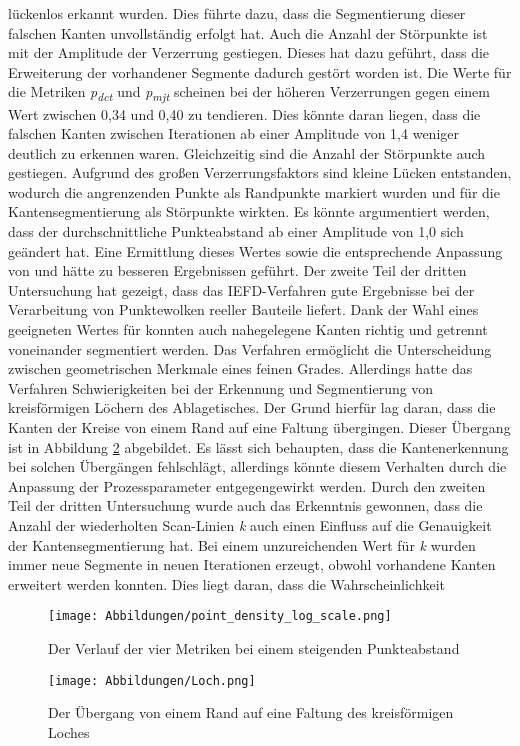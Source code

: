 lückenlos erkannt wurden. Dies führte dazu, dass die Segmentierung dieser falschen Kanten unvollständig erfolgt hat. Auch die Anzahl der Störpunkte ist mit der Amplitude der Verzerrung gestiegen. Dieses hat dazu geführt, dass die Erweiterung der vorhandener Segmente dadurch gestört worden ist. Die Werte für die Metriken  \textit{p\textsubscript{dct}} und \textit{p\textsubscript{mjt}} scheinen bei der höheren Verzerrungen gegen einem Wert zwischen 0,34 und 0,40 zu tendieren. Dies könnte daran liegen, dass die falschen Kanten zwischen Iterationen ab einer Amplitude von 1,4 weniger deutlich zu erkennen waren. Gleichzeitig sind die Anzahl der Störpunkte auch gestiegen. Aufgrund des großen Verzerrungsfaktors sind kleine Lücken entstanden, wodurch die angrenzenden Punkte als Randpunkte markiert wurden und für die Kantensegmentierung als Störpunkte wirkten. Es könnte argumentiert werden, dass der durchschnittliche Punkteabstand ab einer Amplitude von 1,0 sich geändert hat. Eine Ermittlung dieses Wertes sowie die entsprechende Anpassung von \distthresha und \distthreshb hätte zu besseren Ergebnissen geführt. Der zweite Teil der dritten Untersuchung hat gezeigt, dass das IEFD-Verfahren gute Ergebnisse bei der Verarbeitung von Punktewolken reeller Bauteile liefert. Dank der Wahl eines geeigneten Wertes für \distthreshb konnten auch nahegelegene Kanten richtig und getrennt voneinander segmentiert werden. Das Verfahren ermöglicht die Unterscheidung zwischen geometrischen Merkmale eines feinen Grades. Allerdings hatte das Verfahren Schwierigkeiten bei der Erkennung und Segmentierung von kreisförmigen Löchern des Ablagetisches. Der Grund hierfür lag daran, dass die Kanten der Kreise von einem Rand auf eine Faltung übergingen. Dieser Übergang ist in Abbildung \ref{fig: Loch} abgebildet. Es lässt sich behaupten, dass die Kantenerkennung bei solchen Übergängen fehlschlägt, allerdings könnte diesem Verhalten durch die Anpassung der Prozessparameter entgegengewirkt werden. Durch den zweiten Teil der dritten Untersuchung wurde auch das Erkenntnis gewonnen, dass die Anzahl der wiederholten Scan-Linien \textit{k} auch einen Einfluss auf die Genauigkeit der Kantensegmentierung hat. Bei einem unzureichenden Wert für \textit{k} wurden immer neue Segmente in neuen Iterationen erzeugt, obwohl vorhandene Kanten erweitert werden konnten. Dies liegt daran, dass die Wahrscheinlichkeit 

\begin{figure}[t]
	\texttt{[image: Abbildungen/point\_density\_log\_scale.png]}
	\centering
	\caption{Der Verlauf der vier Metriken bei einem steigenden Punkteabstand}
	\label{fig: point_density_trend}
\end{figure}

\begin{figure}[t]
	\texttt{[image: Abbildungen/Loch.png]}
	\centering
	\caption{Der Übergang von einem Rand auf eine Faltung des kreisförmigen Loches}
	\label{fig: Loch}
\end{figure}
